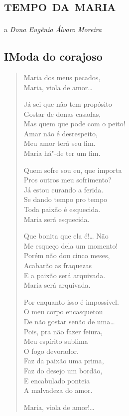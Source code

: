 \chapter[\textsc{tempo da maria}\\\textsc{i}\ \ \ \ Moda do corajoso]{\textsc{tempo da maria} }

\begin{flushright}
a \emph{Dona Eugênia Álvaro Moreira}
\end{flushright}

\section*{I\break Moda do corajoso}

\begin{verse}
Maria dos meus pecados,\\
Maria, viola de amor\ldots{}

Já sei que não tem propósito\\
Gostar de donas casadas,\\
Mas quem que pode com o peito!\\
Amar não é desrespeito,\\
Meu amor terá seu fim.\\
Maria há"-de ter um fim.

Quem sofre sou eu, que importa\\
Pros outros meu sofrimento?\\
Já estou curando a ferida.\\
Se dando tempo pro tempo\\
Toda paixão é esquecida.\\
Maria será esquecida.

Que bonita que ela é!\ldots{} Não\\
Me esqueço dela um momento!\\
Porém não dou cinco meses,\\
Acabarão as fraquezas\\
E a paixão será arquivada.\\
Maria será arquivada.

Por enquanto isso é impossível.\\
O meu corpo encasquetou\\
De não gostar senão de uma\ldots{}\\
Pois, pra não fazer feiura,\\
Meu espírito sublima\\
O fogo devorador.\\
Faz da paixão uma prima,\\
Faz do desejo um bordão,\\
E encabulado ponteia\\
A malvadeza do amor.

Maria, viola de amor!\ldots{}
\end{verse}

